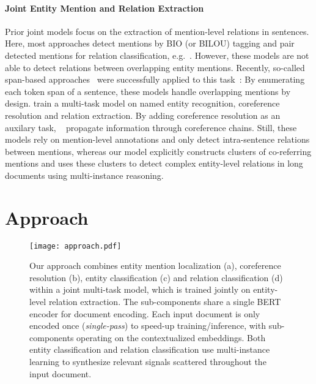 \documentclass[11pt,a4paper]{article}
\begin{document}
\paragraph{Joint Entity Mention and Relation Extraction}
Prior joint models focus on the extraction of mention-level relations in sentences. Here, most approaches detect mentions by BIO (or BILOU) tagging and pair detected mentions for relation classification, e.g.~\cite{gupta:2016:table_filling, zhou:2017:joint_hybrid, zheng:2017:joint_novel_tagging, bekoulis:2018:multi_head, nguyen:2019:biaffine_attention, miwa:2016:stacked_rnn}. However, these models are not able to detect relations between overlapping entity mentions. Recently, so-called span-based approaches~\cite{lee:2017:span_coreference} were successfully applied to this task~\cite{luan:2018:scierc, eberts:2019:spert}: By enumerating each token span of a sentence, these models handle overlapping mentions by design. \citet{wolf:2018:hierarch_multi_task} train a multi-task model on named entity recognition, coreference resolution and relation extraction. By adding coreference resolution as an auxilary task, ~\citet{luan:2019:span_graphs} propagate information through coreference chains. Still, these models rely on mention-level annotations and only detect intra-sentence relations between mentions, whereas our model explicitly constructs clusters of co-referring mentions and uses these clusters to detect complex entity-level relations in long documents using multi-instance reasoning.

\section{Approach} \label{sec:approach}
\begin{figure*}[ht]
    \centering
    \texttt{[image: approach.pdf]}
    \caption{Our approach combines entity mention localization (a), coreference resolution (b), entity classification (c) and relation classification (d) within a joint multi-task model, which is trained jointly on entity-level relation extraction. The sub-components share a single BERT encoder for document encoding. Each input document is only encoded once (\emph{single-pass}) to speed-up training/inference, with sub-components operating on the contextualized embeddings. Both entity classification and relation classification use multi-instance learning to synthesize relevant signals scattered throughout the input document.}
    \label{fig:approach}
\end{figure*}
\end{document}
